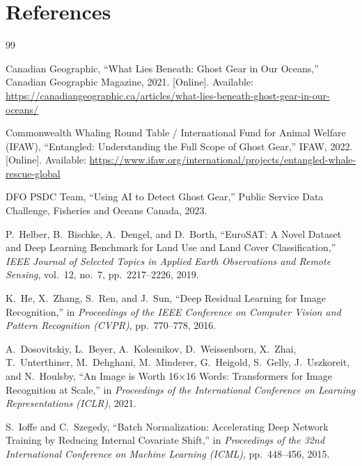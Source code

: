 \documentclass[12pt, letterpaper]{article}
\begin{document}
\newpage
\section*{References}

\begin{thebibliography}{99}

Canadian Geographic,
``What Lies Beneath: Ghost Gear in Our Oceans,''
Canadian Geographic Magazine, 2021.
[Online]. Available:
\url{https://canadiangeographic.ca/articles/what-lies-beneath-ghost-gear-in-our-oceans/}

Commonwealth Whaling Round Table / International Fund for Animal Welfare (IFAW),
``Entangled: Understanding the Full Scope of Ghost Gear,''
IFAW, 2022.
[Online]. Available:
\url{https://www.ifaw.org/international/projects/entangled-whale-rescue-global}

DFO PSDC Team,
``Using AI to Detect Ghost Gear,''
Public Service Data Challenge, Fisheries and Oceans Canada, 2023.

P.\ Helber, B.\ Bischke, A.\ Dengel, and D.\ Borth,
``EuroSAT: A Novel Dataset and Deep Learning Benchmark for Land Use and Land Cover
Classification,''
\textit{IEEE Journal of Selected Topics in Applied Earth Observations and Remote
Sensing}, vol.\ 12, no.\ 7, pp.\ 2217--2226, 2019.

K.\ He, X.\ Zhang, S.\ Ren, and J.\ Sun,
``Deep Residual Learning for Image Recognition,''
in \textit{Proceedings of the IEEE Conference on Computer Vision and Pattern
Recognition (CVPR)}, pp.\ 770--778, 2016.

A.\ Dosovitskiy, L.\ Beyer, A.\ Kolesnikov, D.\ Weissenborn, X.\ Zhai,
T.\ Unterthiner, M.\ Dehghani, M.\ Minderer, G.\ Heigold, S.\ Gelly,
J.\ Uszkoreit, and N.\ Houlsby,
``An Image is Worth 16$\times$16 Words: Transformers for Image Recognition
at Scale,'' in \textit{Proceedings of the International Conference on Learning
Representations (ICLR)}, 2021.

S.\ Ioffe and C.\ Szegedy,
``Batch Normalization: Accelerating Deep Network Training by Reducing Internal
Covariate Shift,''
in \textit{Proceedings of the 32nd International Conference on Machine Learning
(ICML)}, pp.\ 448--456, 2015.


\end{thebibliography}
\end{document}
